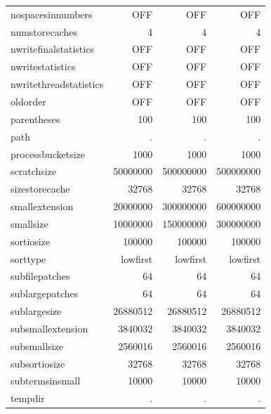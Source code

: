 \begin{center}
\begin{tabular}{lrrr}
nospacesinnumbers &     OFF           & OFF         & OFF          \\
numstorecaches &        4             & 4           & 4            \\
nwritefinalstatistics & OFF           & OFF         & OFF          \\
nwritestatistics &      OFF           & OFF         & OFF          \\
nwritethreadstatistics &OFF           & OFF         & OFF          \\
oldorder &              OFF           & OFF         & OFF          \\
parentheses &           100           & 100         & 100          \\
path &                  .             & .           & .            \\
processbucketsize &     1000          & 1000        & 1000         \\
scratchsize &           50000000      & 500000000   & 500000000    \\
sizestorecache &        32768         & 32768       & 32768        \\
smallextension &        20000000      & 300000000   & 600000000    \\
smallsize &             10000000      & 150000000   & 300000000    \\
sortiosize &            100000        & 100000      & 100000       \\
sorttype &              lowfirst      & lowfirst    & lowfirst     \\
subfilepatches &        64            & 64          & 64           \\
sublargepatches &       64            & 64          & 64           \\
sublargesize &          26880512      & 26880512    & 26880512     \\
subsmallextension &     3840032       & 3840032     & 3840032      \\
subsmallsize &          2560016       & 2560016     & 2560016      \\
subsortiosize &         32768         & 32768       & 32768        \\
subtermsinsmall &       10000         & 10000       & 10000        \\
tempdir &               .             & .           & .            \\

\end{tabular}
\end{center}
